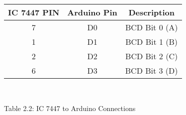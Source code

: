\centering
\begin{tabular}{|c|c|c|}
\hline
IC 7447 PIN & Arduino Pin & Description\\
\hline

7 & D0 & BCD Bit 0 (A)\\
\hline
1 & D1 & BCD Bit 1 (B)\\
\hline
2 & D2 & BCD Bit 2 (C)\\
\hline
6 & D3 & BCD Bit 3 (D)\\
\hline
\end{tabular}\\
\centerline{Table 2.2: IC 7447 to Arduino Connections}
